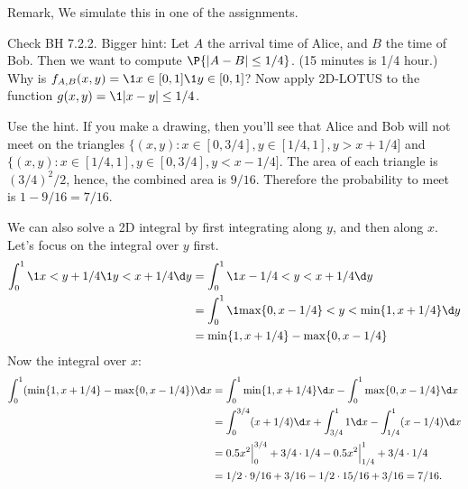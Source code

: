 

\setcounter{theorem}{0}
\begin{exercise}[BH.7.1]
Remark, We simulate this in one of the assignments.
\begin{hint}
Check BH 7.2.2. Bigger hint: Let $A$ the arrival time of Alice, and $B$ the time of Bob. Then we want to compute $\P{|A-B|\leq 1/4}$.  (15 minutes is 1/4 hour.)  Why is $f_{A,B}(x,y) = \1{x\in[0,1]}\1{y\in [0,1]}$? Now apply 2D-LOTUS to the function $g(x,y) = \1{|x-y|\leq 1/4}$.
\end{hint}
\begin{solution}
Use the hint. If you make a drawing, then you'll see that Alice and Bob will not meet on the triangles
$\{(x,y) : x\in [0, 3/4], y\in [1/4, 1], y>x+1/4]$ and $\{(x,y) : x\in [1/4, 1], y\in [0, 3/4], y<x-1/4]$. The area of each triangle is $(3/4)^{2}/2$, hence, the combined area is $9/16$. Therefore the probability to meet is $1-9/16=7/16$.

We can also solve   a 2D integral by first integrating along $y$, and then along $x$. Let's focus on the integral over $y$ first.
\begin{align*}
\int_0^1 \1{x<y+1/4}\1{y<x+1/4} \d y
&=\int_0^1 \1{x-1/4<y<x+1/4} \d y \\
&=\int_0^1 \1{\max\{0, x-1/4\} <y < \min\{1,x+1/4\}} \d y \\
&= \min\{1,x+1/4\} - \max\{0, x-1/4\}
\end{align*}
Now the integral over $x$:
\begin{align*}
  \int_0^1 (\min\{1,x+1/4\} - \max\{0, x-1/4\}) \d x
&=  \int_0^1 \min\{1,x+1/4\}\d x - \int_0^{1}\max\{0, x-1/4\} \d x  \\
&=  \int_0^{3/4}(x+1/4)\d x + \int_{3/4}^{1}1 \d x
 - \int_{1/4}^{1}(x-1/4) \d x \\
  &=0.5 x^2\Big|_{0}^{3/4} + 3/4\cdot 1/4 - 0.5x^2\Big|_{1/4}^1 + 3/4\cdot 1/4 \\
  &= 1/2\cdot 9/16 + 3/16 - 1/2\cdot 15/16 + 3/16 = 7/16.
\end{align*}

\end{solution}
\end{exercise}



